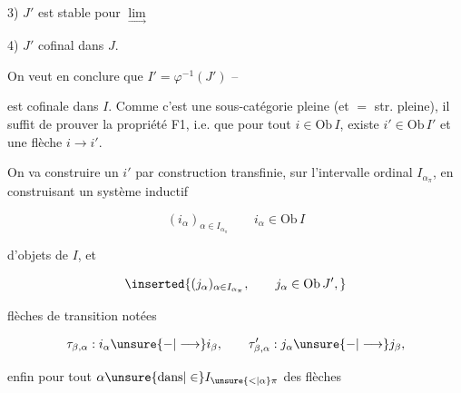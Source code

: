 
3) $J'$ est  stable pour \deleted{$\unsure{\lim}$} $\underset{\longrightarrow}{\lim}$  

4) $J'$ cofinal dans $J$.

On veut en conclure que $I'=\varphi^{-1}(J')$ --


est cofinale dans $I$. Comme c'est une sous-catégorie pleine (et $=$ str. pleine), il suffit de prouver la propriété F1, i.e. que pour tout $i\in\mathrm{Ob}\,I$, existe $i'\in\mathrm{Ob}\,I'$  et une flèche $i\longrightarrow i'$.

On va construire un $i'$ par construction transfinie, sur l'intervalle ordinal $I_{\alpha_\pi}$, en construisant un système inductif

\[
(i_\alpha)_{\alpha\in I_{\alpha_\pi}}\qquad i_\alpha\in\mathrm{Ob}\,I
\]

d'objets de $I$, et    

\[
\inserted{(j_\alpha)_{\alpha\in I_{\alpha_\pi}},\qquad j_\alpha\in\mathrm{Ob}\,J',}
\]

 flèches de transition notées

\[
\tau_{\beta,\alpha}:i_\alpha\unsure{-|\longrightarrow}i_\beta,\qquad
\tau'_{\beta,\alpha}:j_\alpha\unsure{-|\longrightarrow}j_\beta,
\]

enfin pour tout $\alpha\unsure{\text{dans}|\in}I_{\unsure{<|\alpha}\pi}$ des flèches


